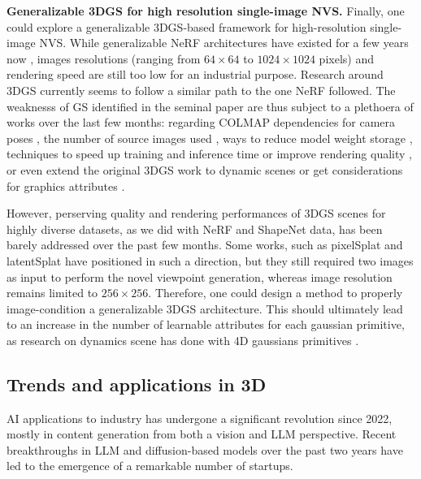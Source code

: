 %
\noindent \textbf{Generalizable 3DGS for high resolution single-image NVS.} Finally, one could explore a generalizable 3D\ac{GS}-based framework for high-resolution single-image \ac{NVS}. While generalizable \ac{NeRF} architectures have existed for a few years now \citep{yu2021pixelnerf,li2022symmnerf,lin2023vision}, images resolutions (ranging from $64\times 64$ to $1024\times 1024$ pixels) and rendering speed are still too low for an industrial purpose. Research around 3D\ac{GS} currently seems to follow a similar path to the one \ac{NeRF} followed. The weaknesss of \ac{GS} identified in the seminal paper \citep{kerbl20233d} are thus subject to a plethoera of works over the last few months: regarding COLMAP dependencies for camera poses \citep{fu2023colmapfree}, the number of source images used \citep{xiong2023sparsegs,yang2024gaussianobject}, ways to reduce model weight storage \citep{niedermayr2023compressed}, techniques to speed up training and inference time \citep{fan2024instantsplat} or improve rendering quality \citep{yu2023mip}, or even extend the original 3D\ac{GS} work to dynamic scenes \citep{luiten2023dynamic} or get considerations for graphics attributes \citep{wu2024deferredgs}.  

However, perserving quality and rendering performances of 3D\ac{GS} scenes for highly diverse datasets, as we did with \ac{NeRF} \citep{landreau2024epinerf} and ShapeNet \citep{chang2015shapenet} data, has been barely addressed over the past few months. Some works, such as pixelSplat \citep{charatan23pixelsplat} and latentSplat \citep{wewer24latentsplat} have positioned in such a direction, but they still required two images as input to perform the novel viewpoint generation, whereas image resolution remains limited to $256\times 256$. Therefore, one could design a method to properly image-condition a generalizable 3D\ac{GS} architecture. This should ultimately lead to an increase in the number of learnable attributes for each gaussian primitive, as research on dynamics scene has done with 4D gaussians primitives \citep{luiten2023dynamic,gao2024gaussianflow}.  

\subsection{Trends and applications in 3D}
\ac{AI} applications to industry has undergone a significant revolution since 2022, mostly in content generation from both a vision and \ac{LLM} perspective. Recent breakthroughs in \ac{LLM} and diffusion-based models over the past two years have led to the emergence of a remarkable number of startups. 

